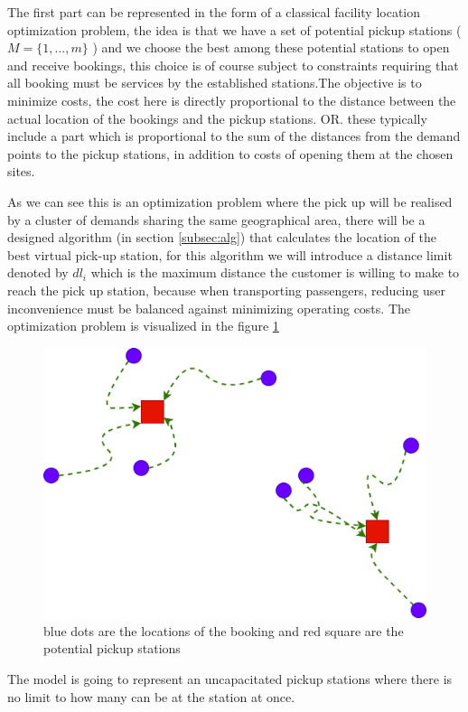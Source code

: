 \documentclass{article}
\begin{document}
The first part can be represented in the form of a classical facility location optimization problem, the idea is that we have a set of potential pickup stations (  $M =  \{ 1, ..., m \}$ ) and we choose the best among these potential stations to open and receive bookings, this choice is of course subject to constraints requiring that all booking must be services by the established stations.The objective is to minimize costs, the cost here is directly proportional to the distance between the actual location of the bookings and the pickup stations. OR. these typically include a part which is proportional to the sum of the distances from the demand points to the pickup stations, in addition to costs of opening them at the chosen sites.

\label{sec:walk_limit}
As we can see this is an optimization problem where the pick up will be realised by a cluster of demands sharing the same geographical area, there will be a designed algorithm (in section \ref{subsec:alg})
that calculates the location of the best virtual pick-up station, for this algorithm we will introduce a distance limit denoted by $dl_i$ which is the maximum distance the customer is willing to make to reach the pick up station,  because when transporting passengers, reducing user inconvenience must be balanced against minimizing operating costs. The optimization problem is visualized in the figure \ref{fig:p-median}

\begin{figure}[H]
    \centering 
  \includegraphics[width=0.5\linewidth]{pictures/pmedian}
  \caption{blue dots are the locations of the booking and red square are the potential pickup stations}
\label{fig:p-median}
\end{figure}

The model is going to represent an uncapacitated  pickup stations where there is no limit to how many can be at the station at once.
\end{document}
